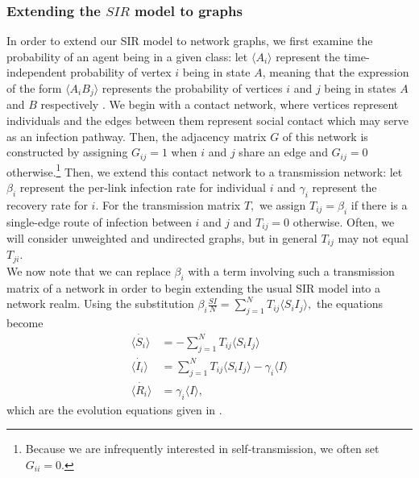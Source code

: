 \documentclass[../report.tex]{subfiles}
\begin{document}

\subsubsection{Extending the $SIR$ model to graphs}

In order to extend our SIR model to network graphs, we first examine the probability of an agent being in a given class: let $\langle A_i \rangle$ represent the time-independent probability of vertex $i$ being in state $A$, meaning that the expression of the form $\langle A_i B_j \rangle$ represents the probability of vertices $i$ and $j$ being in states $A$ and $B$ respectively \cite{kiss_2014}. We begin with a contact network, where vertices represent individuals and the edges between them represent social contact which may serve as an infection pathway. Then, the adjacency matrix $G$ of this network is constructed by assigning $G_{ij} = 1$ when $i$ and $j$ share an edge and $G_{ij} = 0$ otherwise.\footnote{Because we are infrequently interested in self-transmission, we often set $G_{ii}=0.$} Then, we extend this contact network to a transmission network: let $\beta_i$ represent the per-link infection rate for individual $i$ and $\gamma_i$ represent the recovery rate for $i$. For the transmission matrix $T,$ we assign $T_{ij}=\beta_i$ if there is a single-edge route of infection between $i$ and $j$ and $T_{ij}=0$ otherwise. Often, we will consider unweighted and undirected graphs, but in general $T_{ij}$ may not equal $T_{ji}$.\\
We now note that we can replace $\beta_i$ with a term involving such a transmission matrix of a network in order to begin extending the usual SIR model into a network realm. Using the substitution $ \beta_i \frac{SI}{N} = \sum^{N}_{j=1}T_{ij} \langle S_i I_j \rangle,$ the equations become
\begin{align*}
\dot{\langle S_i \rangle} & = -\sum^{N}_{j=1}T_{ij} \langle S_i I_j \rangle\\
\dot{\langle I_i \rangle} & =\sum^{N}_{j=1}T_{ij}\langle S_i I_j \rangle - \gamma_i \langle I \rangle \\
\dot{\langle R_i \rangle} & = \gamma_i \langle I \rangle,
\end{align*}
which are the evolution equations given in \cite{kiss_2014}.
\end{document}
